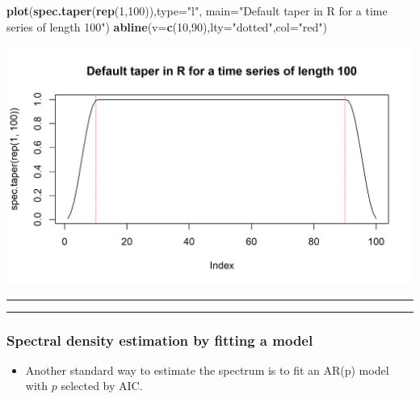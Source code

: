 \documentclass[]{article}
\newenvironment{Shaded}{\begin{snugshade}}{\end{snugshade}}
\newcommand{\KeywordTok}[1]{\textcolor[rgb]{0.13,0.29,0.53}{\textbf{#1}}}
\newcommand{\DataTypeTok}[1]{\textcolor[rgb]{0.13,0.29,0.53}{#1}}
\newcommand{\DecValTok}[1]{\textcolor[rgb]{0.00,0.00,0.81}{#1}}
\newcommand{\StringTok}[1]{\textcolor[rgb]{0.31,0.60,0.02}{#1}}
\newcommand{\NormalTok}[1]{#1}
\providecommand{\tightlist}{%
  \setlength{\itemsep}{0pt}\setlength{\parskip}{0pt}}
\begin{document}
\begin{Shaded}
\begin{Highlighting}[]
\KeywordTok{plot}\NormalTok{(}\KeywordTok{spec.taper}\NormalTok{(}\KeywordTok{rep}\NormalTok{(}\DecValTok{1}\NormalTok{,}\DecValTok{100}\NormalTok{)),}\DataTypeTok{type=}\StringTok{"l"}\NormalTok{,}
  \DataTypeTok{main=}\StringTok{"Default taper in R for a time series of length 100"}\NormalTok{)}
\KeywordTok{abline}\NormalTok{(}\DataTypeTok{v=}\KeywordTok{c}\NormalTok{(}\DecValTok{10}\NormalTok{,}\DecValTok{90}\NormalTok{),}\DataTypeTok{lty=}\StringTok{"dotted"}\NormalTok{,}\DataTypeTok{col=}\StringTok{"red"}\NormalTok{)}
\end{Highlighting}
\end{Shaded}

\begin{center}\includegraphics{figure/intro-taper_plot-1} \end{center}

\begin{center}\rule{0.5\linewidth}{\linethickness}\end{center}

\begin{center}\rule{0.5\linewidth}{\linethickness}\end{center}

\subsubsection{Spectral density estimation by fitting a
model}\label{spectral-density-estimation-by-fitting-a-model}

\begin{itemize}
\tightlist
\item
  Another standard way to estimate the spectrum is to fit an AR(p) model
  with \(p\) selected by AIC.
\end{itemize}
\end{document}
